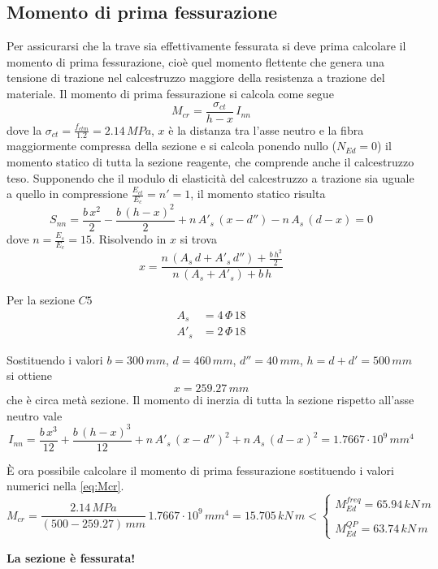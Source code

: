 \subsection{Momento di prima fessurazione}
Per assicurarsi che la trave sia effettivamente fessurata si deve prima calcolare il momento di prima fessurazione, cioè quel momento flettente che genera una tensione di trazione nel calcestruzzo maggiore della resistenza a trazione del materiale. Il momento di prima fessurazione si calcola come segue
\begin{equation}
    \label{eq:Mcr}
	M_{cr} = \dfrac{\sigma_{ct}}{h-x}\,I_{nn}
\end{equation}
dove la $\sigma_{ct} = \frac{f_{ctm}}{1.2} = 2.14\,MPa$, $x$ è la distanza tra l'asse neutro e la fibra maggiormente compressa della sezione e si calcola ponendo nullo ($N_{Ed} = 0$) il momento statico di tutta la sezione reagente, che comprende anche il calcestruzzo teso. Supponendo che il modulo di elasticità del calcestruzzo a trazione sia uguale a quello in compressione $\frac{E_{ct}}{E_c} = n' = 1$, il momento statico risulta
\[
S_{nn} = \dfrac{b\,x^2}{2} - \dfrac{b\,(h-x)^2}{2} + n\,A'_s\,(x-d'') - n\,A_s\,(d-x) = 0
\]
dove $n = \frac{E_s}{E_c} = 15$. Risolvendo in $x$ si trova
\[
x = \dfrac{n\,(A_s\,d + A'_s\,d'')+ \frac{b\,h^2}{2}}{n\,(A_s + A'_s) + b\,h}
\]

Per la sezione $C5$
\begin{align*}
    A_s &= 4\,\Phi\,18\\
	A'_s &= 2\,\Phi\,18
\end{align*}

Sostituendo i valori $b = 300\,mm$, $d = 460\,mm$, $d'' = 40\,mm$, $h = d+d' = 500\,mm$ si ottiene 
\[
    x = 259.27\,mm
\]
che è circa metà sezione. Il momento di inerzia di tutta la sezione rispetto all'asse neutro vale
\[
I_{nn} = \dfrac{b\,x^3}{12} + \dfrac{b\,(h-x)^3}{12} + n\,A'_s\,(x-d'')^2 + n\,A_s\,(d-x)^2 = 1.7667\cdot 10^9\, mm^4
\]

\`E ora possibile calcolare il momento di prima fessurazione sostituendo i valori numerici nella \eqref{eq:Mcr}.
\[
M_{cr} = \dfrac{2.14\,MPa}{(500-259.27)\,mm}\,1.7667\cdot 10^9\, mm^4 = 15.705\,kN\,m < 
\begin{cases}
	M_{Ed}^{freq} = 65.94\,kN\,m\\\\
	M_{Ed}^{QP} = 63.74\,kN\,m
\end{cases}
\]

\textbf{La sezione è fessurata!}


